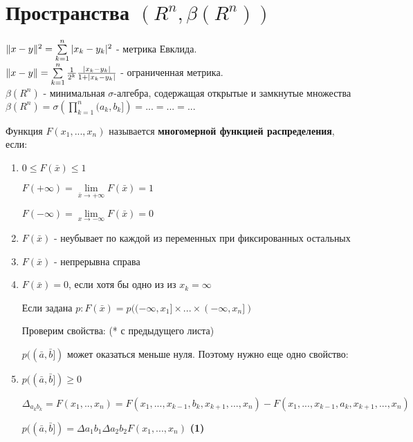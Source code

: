 \section{Пространства $(R^n, \beta (R^n))$}

$\Arrowvert x-y \Arrowvert ^{2} = \sum\limits_{k=1}^{n} | x_{k}-y_{k}|^{2}$ -  метрика Евклида.\\
$\Arrowvert x-y \Arrowvert =  \sum\limits_{k=1}^{n} \frac{1}{2^{k}} \frac{ | x_{k}-y_{k}|} {1 + |x_{k} - y_{k}|}$ - ограниченная метрика.\\
$\beta (R^{n})$ - минимальная $\sigma$-алгебра, содержащая открытые и замкнутые множества $\beta(R^{n}) = \sigma\left(\prod\limits_{k=1}^{n} (a_{k}, b_{k}]\right)=...=...=...$

\begin{definition}
  Функция $F(x_{1}, ..., x_{n})$ называется \textbf{многомерной функцией распределения}, если:
  \begin{enumerate}
    \item $0 \leq F(\bar{x}) \leq 1$\par
      $F(+\infty) = \lim\limits_{\bar{x}\rightarrow + \infty} F(\bar{x}) = 1$\par
      $F(-\infty) = \lim\limits_{x \rightarrow -\infty} F(\bar{x}) = 0$

    \item $F(\bar{x})$ - неубывает по каждой из переменных при фиксированных остальных

    \item $F(\bar{x})$ - непрерывна справа

    \item $F(\bar{x}) = 0$, если  хотя бы одно из из $x_{k} = \infty$\par
      Если задана $p: F(\bar{x}) = p((-\infty, x_{1}] \times ... \times (-\infty, x_{n}])$\par
      Проверим свойства: (* с предыдущего листа)\par
      $p((\bar{a}, \bar{b}])$ может оказаться меньше нуля. Поэтому нужно еще одно свойство:

    \item $p((\bar{a}, \bar{b}]) \geq 0$\par
      $\Delta_{a_{k}b_{k}} = F(x_{1}, ..,x_{n}) = F(x_{1},...,x_{k-1}, b_{k}, x_{k+1}, ..., x_{n}) - F(x_{1}, ..., x_{k-1}, a_{k}, x_{k+1}, ..., x_{n})$\par
      $p((\bar{a}, \bar{b}]) = \Delta a_{1}b_{1}\Delta a_{2}b_{2} F(x_{1},...,x_{n})$ \textbf{(1)}
  \end{enumerate}
\end{definition}

